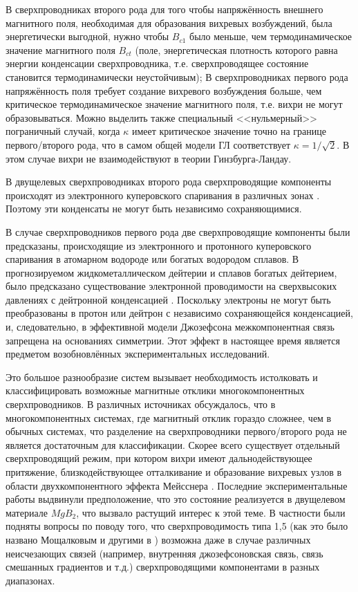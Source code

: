 В сверхпроводниках второго рода для того чтобы напряжённость внешнего 
магнитного поля, необходимая для образования вихревых возбуждений, была 
энергетически выгодной, нужно чтобы \( B_{c1} \) было меньше, чем 
термодинамическое значение магнитного поля \( B_{ct} \) (поле, энергетическая 
плотность которого равна энергии конденсации сверхпроводника, т.е. 
сверхпроводящее состояние становится термодинамически неустойчивым); В 
сверхпроводниках первого рода напряжённость поля требует создание вихревого 
возбуждения больше, чем критическое термодинамическое значение магнитного 
поля, т.е. вихри не могут образовываться. Можно выделить также специальный 
<<нульмерный>> пограничный случай, когда \( \kappa \) имеет критическое 
значение точно на границе первого/второго рода, что в самом общей модели ГЛ 
соответствует \( \kappa = 1/\sqrt{2} \). В этом случае вихри не 
взаимодействуют в теории Гинзбурга-Ландау.

В двущелевых сверхпроводниках второго рода сверхпроводящие компоненты 
происходят из электронного куперовского спаривания в различных зонах 
\cite{bib:6}. Поэтому эти конденсаты не могут быть независимо сохраняющимися.

В случае сверхпроводников первого рода две сверхпроводящие компоненты были 
предсказаны, происходящие из электронного и протонного куперовского спаривания 
в атомарном водороде или богатых водородом сплавов. В прогнозируемом 
жидкометаллическом дейтерии и сплавов богатых дейтерием, было предсказано 
существование электронной проводимости на сверхвысоких давлениях с дейтронной 
конденсацией  \cite{bib:12.1,bib:12.2,bib:13,bib:14}. Поскольку электроны не 
могут быть преобразованы в протон или дейтрон с независимо сохраняющейся 
конденсацией, и, следовательно, в эффективной модели Джозефсона 
межкомпонентная связь запрещена на основаниях симметрии. Этот эффект в 
настоящее время является предметом возобновлённых экспериментальных 
исследований.

Это большое разнообразие систем вызывает необходимость истолковать и 
классифицировать возможные магнитные отклики многокомпонентных 
сверхпроводников. В различных источниках обсуждалось, что в многокомпонентных 
системах, где магнитный отклик гораздо сложнее, чем в обычных системах, что 
разделение на сверхпроводники первого/второго рода не является достаточным для 
классификации. Скорее всего существует отдельный сверхпроводящий режим, при 
котором вихри имеют дальнодействующее притяжение, близкодействующее 
отталкивание и образование вихревых узлов в области двухкомпонентного эффекта 
Мейсснера \cite{bib:1,bib:2}. Последние экспериментальные работы 
\cite{bib:16,bib:17} выдвинули предположение, что это состояние реализуется в 
двущелевом материале \( MgB_2 \), что вызвало растущий интерес к этой теме. В 
частности были подняты вопросы по поводу того, что сверхпроводимость типа 1,5 
(как это было названо Мощалковым и другими в \cite{bib:16}) возможна даже в 
случае различных неисчезающих связей (например, внутренняя джозефсоновская 
связь, связь смешанных градиентов и т.д.) сверхпроводящими компонентами в 
разных диапазонах. \cite{bib:main}

